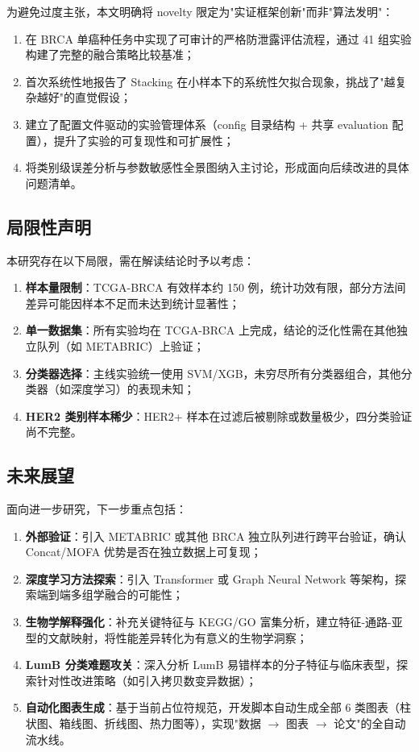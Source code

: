 为避免过度主张，本文明确将 novelty 限定为"实证框架创新"而非"算法发明"：

\begin{enumerate}
    \item 在 BRCA 单癌种任务中实现了可审计的严格防泄露评估流程，通过 41 组实验构建了完整的融合策略比较基准；
    \item 首次系统性地报告了 Stacking 在小样本下的系统性欠拟合现象，挑战了"越复杂越好"的直觉假设；
    \item 建立了配置文件驱动的实验管理体系（config 目录结构 + 共享 evaluation 配置），提升了实验的可复现性和可扩展性；
    \item 将类别级误差分析与参数敏感性全景图纳入主讨论，形成面向后续改进的具体问题清单。
\end{enumerate}

\subsection{局限性声明}

本研究存在以下局限，需在解读结论时予以考虑：

\begin{enumerate}
    \item \textbf{样本量限制}：TCGA-BRCA 有效样本约 150 例，统计功效有限，部分方法间差异可能因样本不足而未达到统计显著性；
    \item \textbf{单一数据集}：所有实验均在 TCGA-BRCA 上完成，结论的泛化性需在其他独立队列（如 METABRIC）上验证；
    \item \textbf{分类器选择}：主线实验统一使用 SVM/XGB，未穷尽所有分类器组合，其他分类器（如深度学习）的表现未知；
    \item \textbf{HER2 类别样本稀少}：HER2+ 样本在过滤后被剔除或数量极少，四分类验证尚不完整。
\end{enumerate}

\subsection{未来展望}

面向进一步研究，下一步重点包括：

\begin{enumerate}
    \item \textbf{外部验证}：引入 METABRIC 或其他 BRCA 独立队列进行跨平台验证，确认 Concat/MOFA 优势是否在独立数据上可复现；
    \item \textbf{深度学习方法探索}：引入 Transformer 或 Graph Neural Network 等架构，探索端到端多组学融合的可能性；
    \item \textbf{生物学解释强化}：补充关键特征与 KEGG/GO 富集分析，建立特征-通路-亚型的文献映射，将性能差异转化为有意义的生物学洞察；
    \item \textbf{LumB 分类难题攻关}：深入分析 LumB 易错样本的分子特征与临床表型，探索针对性改进策略（如引入拷贝数变异数据）；
    \item \textbf{自动化图表生成}：基于当前占位符规范，开发脚本自动生成全部 6 类图表（柱状图、箱线图、折线图、热力图等），实现"数据 $\to$ 图表 $\to$ 论文"的全自动流水线。
\end{enumerate}
